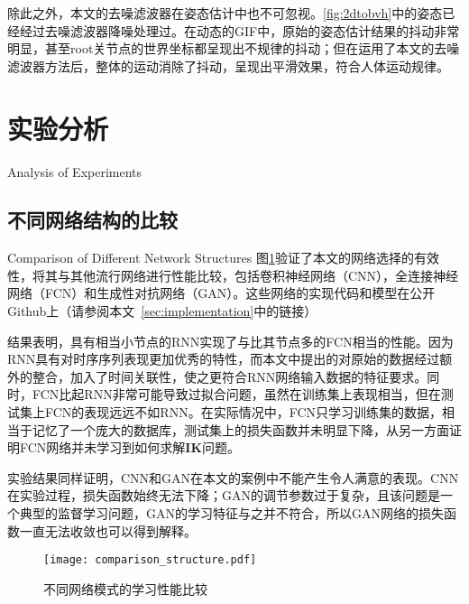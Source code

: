 除此之外，本文的去噪滤波器在姿态估计中也不可忽视。\cref{fig:2dtobvh}中的姿态已经经过去噪滤波器降噪处理过。在动态的GIF中，原始的姿态估计结果的抖动非常明显，甚至root关节点的世界坐标都呈现出不规律的抖动；但在运用了本文的去噪滤波器方法后，整体的运动消除了抖动，呈现出平滑效果，符合人体运动规律。


\section{实验分析}{Analysis of Experiments}

\subsection{不同网络结构的比较}{Comparison of Different Network Structures}
图\ref{fig:comparison_structure}验证了本文的网络选择的有效性，将其与其他流行网络进行性能比较，包括卷积神经网络（CNN），全连接神经网络（FCN）和生成性对抗网络（GAN）。这些网络的实现代码和模型在公开Github上（请参阅本文~\ref{sec:implementation}中的链接）

结果表明，具有相当小节点的RNN实现了与比其节点多的FCN相当的性能。因为RNN具有对时序序列表现更加优秀的特性，而本文中提出的对原始的数据经过额外的整合，加入了时间关联性，使之更符合RNN网络输入数据的特征要求。同时，FCN比起RNN非常可能导致过拟合问题，虽然在训练集上表现相当，但在测试集上FCN的表现远远不如RNN。在实际情况中，FCN只学习训练集的数据，相当于记忆了一个庞大的数据库，测试集上的损失函数并未明显下降，从另一方面证明FCN网络并未学习到如何求解$\mathbf{IK}$问题。

实验结果同样证明，CNN和GAN在本文的案例中不能产生令人满意的表现。CNN在实验过程，损失函数始终无法下降；GAN的调节参数过于复杂，且该问题是一个典型的监督学习问题，GAN的学习特征与之并不符合，所以GAN网络的损失函数一直无法收敛也可以得到解释。
\begin{figure}[!htbp]
	\centering
	\texttt{[image: comparison\_structure.pdf]}
	\caption[]{\label{fig:comparison_structure}
		不同网络模式的学习性能比较
	}
\end{figure}
